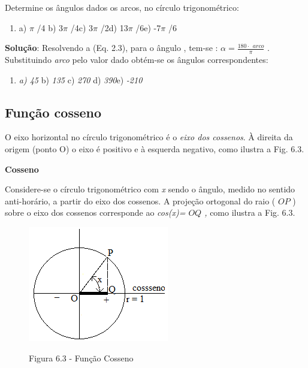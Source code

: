 \begin{texemplo}
Determine os ângulos dados os arcos, no círculo trigonométrico:

\begin{enumerate}
    \item a) $ \pi $ /4 \tab \tab b) 3$ \pi $ /4\tab \tab c) 3$ \pi $ /2\tab     \tab  d) 13$ \pi $ /6\tab e) -7$ \pi $ /6
\end{enumerate}

\textbf{Solução}: Resolvendo a (Eq. 2.3), para o ângulo , tem-se :   \(  \alpha =\frac{180 \cdot ~~arco  }{ \pi } \)  . Substituindo \textit{arco} pelo valor dado obtém-se os ângulos correspondentes:

\begin{enumerate}
    \item \textit{a) 45\degree} \tab \tab b) \textit{135\degree } \tab c) \textit{270\degree}     \tab  d) \textit{390\degree  \tab }e) \textit{-210\degree  }\qedsymbol
\end{enumerate}
\end{texemplo}

\subsection{Função cosseno}

O eixo horizontal no círculo trigonométrico é o \textit{eixo dos cossenos}. À direita da origem (ponto O) o eixo é positivo e à esquerda negativo, como ilustra a Fig. 6.3.

\begin{caixa}
\textbf{Cosseno}

Considere-se o círculo trigonométrico com \textit{x} sendo o ângulo, medido no sentido anti-horário, a partir do eixo dos cossenos. A projeção ortogonal do raio ( \( OP \) ) sobre o eixo dos cossenos corresponde ao \textit{cos(x)= \(  OQ \) , }como ilustra a Fig. 6.3.
\end{caixa}

\begin{figure}[H]
    \begin{Center}
        \includegraphics[width=2.42in,height=1.98in]{capitulos/trigonometria_e_funcoes_trigonometricas/media/image29.png}
        
        Figura 6.3 - Função Cosseno
    \end{Center}
\end{figure}


